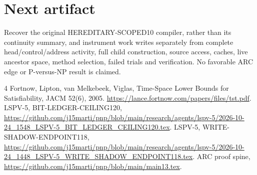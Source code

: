 \documentclass[11pt]{article}
\begin{document}
\section{Next artifact}
Recover the original HEREDITARY-SCOPED10 compiler, rather than its continuity summary, and instrument work writes separately from complete head/control/address activity, full child construction, source access, caches, live ancestor space, method selection, failed trials and verification. No favorable ARC edge or P-versus-NP result is claimed.
\begin{thebibliography}{4}
 Fortnow, Lipton, van Melkebeek, Viglas, Time-Space Lower Bounds for Satisfiability, JACM 52(6), 2005. \url{https://lance.fortnow.com/papers/files/tst.pdf}.
 LSPV-5, BIT-LEDGER-CEILING120, \url{https://github.com/j15marti/pnp/blob/main/research/agents/lspv-5/2026-10-24_1548_LSPV-5_BIT_LEDGER_CEILING120.tex}.
 LSPV-5, WRITE-SHADOW-ENDPOINT118, \url{https://github.com/j15marti/pnp/blob/main/research/agents/lspv-5/2026-10-24_1448_LSPV-5_WRITE_SHADOW_ENDPOINT118.tex}.
 ARC proof spine, \url{https://github.com/j15marti/pnp/blob/main/main13.tex}.
\end{thebibliography}
\end{document}
